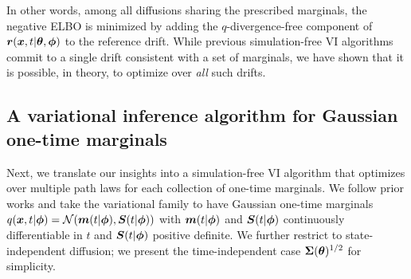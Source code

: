 In other words, among all diffusions sharing the prescribed marginals, the negative ELBO is minimized by adding the $q$-divergence-free component of $\boldsymbol{r}(\boldsymbol{x}, t | \boldsymbol{\theta}, \boldsymbol{\phi})$ to the reference drift.
While previous simulation-free VI algorithms commit to a single drift consistent with a set of marginals, we have shown that it is possible, in theory, to optimize over \emph{all} such drifts.

\begin{algorithm}[t]
\caption{Helmholtz-SDE training}
\label{alg:helmholtz_sde_main}

\end{algorithm}
\vspace{-1em}

\subsection{A variational inference algorithm for Gaussian one-time marginals}\label{subsec:gaussian-marginals}

Next, we translate our insights into a simulation-free VI algorithm that optimizes over multiple path laws for each collection of one-time marginals.
We follow prior works \cite{course2023state,course2023amortized,bartosh2025sde} and take the variational family to have Gaussian one-time marginals $q(\boldsymbol{x}, t | \boldsymbol{\phi}) = \mathcal{N}(\boldsymbol{m}(t | \boldsymbol{\phi}), \boldsymbol{S}(t | \boldsymbol{\phi}))$ with $\boldsymbol{m}(t | \boldsymbol{\phi})$ and $\boldsymbol{S}(t | \boldsymbol{\phi})$ continuously differentiable in $t$ and $\boldsymbol{S}(t | \boldsymbol{\phi})$ positive definite. 
We further restrict to state-independent diffusion; we present the time-independent case $\boldsymbol{\Sigma}(\boldsymbol{\theta})^{1/2}$ for simplicity.

